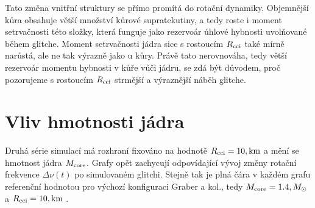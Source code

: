 \documentclass[%
final%
,htext%
]{ipothes}
\begin{document}
Tato změna vnitřní struktury se přímo promítá do rotační dynamiky. Objemnější kůra obsahuje větší množství kůrové supratekutiny, a tedy roste i moment setrvačnosti této složky, která funguje jako rezervoár úhlové hybnosti uvolňované během glitche. Moment setrvačnosti jádra sice s rostoucím $R_{\rm cci}$ také mírně narůstá, ale ne tak výrazně jako u kůry. Právě tato nerovnováha, tedy větší rezervoár momentu hybnosti v kůře vůči jádru, se zdá být důvodem, proč pozorujeme s rostoucím $R_{\rm cci}$ strmější a výraznější náběh glitche.


\clearpage\section{Vliv hmotnosti jádra}

Druhá série simulací má rozhraní fixováno na hodnotě $R_{\rm cci} = 10,\mathrm{km}$ a mění se hmotnost jádra $M_{\rm core}$. Grafy opět zachycují odpovídající vývoj změny rotační frekvence $\Delta\nu(t)$ po simulovaném glitchi. Stejně tak je plná čára v každém grafu referenční hodnotou pro výchozí konfiguraci Graber a kol., tedy $M_{\rm core} = 1.4,M_{\odot}$ a $R_{\rm cci} = 10,\mathrm{km}$ \cite{graber2018}.
\end{document}
